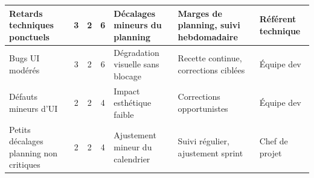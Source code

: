\begin{longtable}{|p{3cm}|c|c|c|p{4.1cm}|p{4.1cm}|p{2.3cm}|}
Retards techniques ponctuels
& 3 & 2 & 6
& Décalages mineurs du planning
& Marges de planning, suivi hebdomadaire
& Référent technique \\ \hline

Bugs UI modérés
& 3 & 2 & 6
& Dégradation visuelle sans blocage
& Recette continue, corrections ciblées
& Équipe dev \\ \hline

Défauts mineurs d’UI
& 2 & 2 & 4
& Impact esthétique faible
& Corrections opportunistes
& Équipe dev \\ \hline

Petits décalages planning non critiques
& 2 & 2 & 4
& Ajustement mineur du calendrier
& Suivi régulier, ajustement sprint
& Chef de projet \\ \hline

\end{longtable}